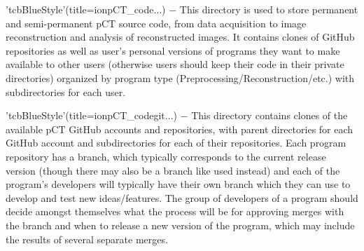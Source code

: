 \begin{tcbenvironment}
\begin{tcbparagraph}
\end{tcbparagraph}
\begin{tcbparagraph}'tcbBlueStyle'(title=\dirsep ion\dirsep pCT\_code\dirsep $\dots$)
$\boldsymbol{-}$ This directory is used to store permanent and semi-permanent pCT source code, from data acquisition to image reconstruction and analysis of reconstructed images.  It contains clones of GitHub repositories as well as user's personal versions of programs they want to make available to other users (otherwise users should keep their code in their private directories) organized by program type (Preprocessing/Reconstruction/etc.) with subdirectories for each user.
\end{tcbparagraph}
\begin{tcbparagraph}'tcbBlueStyle'(title=\dirsep ion\dirsep pCT\_code\dirsep git\dirsep{}\dirsep{}\dirsep $\dots$)
$\boldsymbol{-}$ This directory contains clones of the available pCT GitHub accounts and repositories, with parent directories for each GitHub account and subdirectories for each of their repositories.  Each program repository has a  branch, which typically corresponds to the current release version (though there may also be a branch like  used instead) and each of the program's developers will typically have their own branch which they can use to develop and test new ideas/features.  The group of developers of a program should decide amongst themselves what the process will be for approving merges with the  branch and when to release a new version of the program, which may include the results of several separate merges.\\[\tcbparskip]


\end{tcbparagraph}
\end{tcbenvironment}
